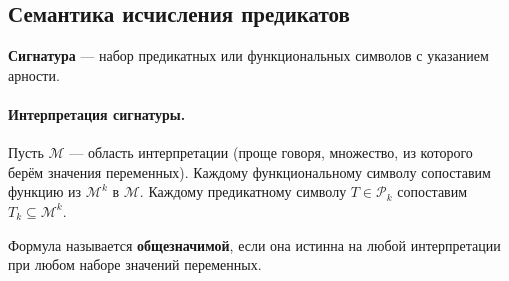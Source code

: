 \documentclass[11pt]{article}
\begin{document}
\subsection{Семантика исчисления предикатов}

\begin{definition}
    \textbf{Сигнатура} --- набор предикатных или функциональных символов с указанием арности.
\end{definition}

\paragraph{Интерпретация сигнатуры.} Пусть $\mathcal{M}$ --- область интерпретации (проще говоря, множество, из которого берём значения переменных). Каждому функциональному символу сопоставим функцию из $\mathcal{M}^k$ в $\mathcal{M}$.
Каждому предикатному символу $T \in \mathcal{P}_k$ сопоставим $T_k \subseteq \mathcal{M}^k$.

\begin{definition}
    Формула называется \textbf{общезначимой}, если она истинна на любой интерпретации при любом наборе значений переменных.
\end{definition}
\end{document}
